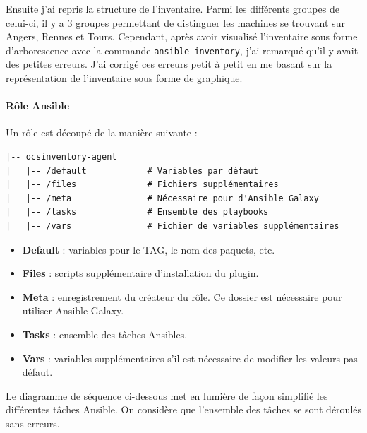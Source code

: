 \documentclass[12pt]{article}
\begin{document}
Ensuite j'ai repris la structure de l'inventaire. 
Parmi les différents groupes de celui-ci, il y a 3 groupes permettant de distinguer les machines se trouvant sur Angers, Rennes et Tours. 
Cependant, après avoir visualisé l'inventaire sous forme d'arborescence avec la commande \verb|ansible-inventory|, j'ai remarqué qu'il y avait des petites erreurs. 
J'ai corrigé ces erreurs petit à petit en me basant sur la représentation de l'inventaire sous forme de graphique.

\paragraph{Rôle Ansible}
Un rôle est découpé de la manière suivante :
\begin{verbatim}
|-- ocsinventory-agent
|   |-- /default            # Variables par défaut
|   |-- /files              # Fichiers supplémentaires
|   |-- /meta               # Nécessaire pour d'Ansible Galaxy
|   |-- /tasks              # Ensemble des playbooks
|   |-- /vars               # Fichier de variables supplémentaires
\end{verbatim}

\begin{itemize}
    \item \textbf{Default} : variables pour le TAG, le nom des paquets, etc.
    \item \textbf{Files} : scripts supplémentaire d'installation du plugin.
    \item \textbf{Meta} : enregistrement du créateur du rôle. Ce dossier est nécessaire pour utiliser Ansible-Galaxy.
    \item \textbf{Tasks} : ensemble des tâches Ansibles.
    \item \textbf{Vars} : variables supplémentaires s'il est nécessaire de modifier les valeurs pas défaut.
\end{itemize}

\newpage
Le diagramme de séquence ci-dessous met en lumière de façon simplifié les différentes tâches Ansible. On considère que l'ensemble des tâches se sont déroulés sans erreurs.
\end{document}
